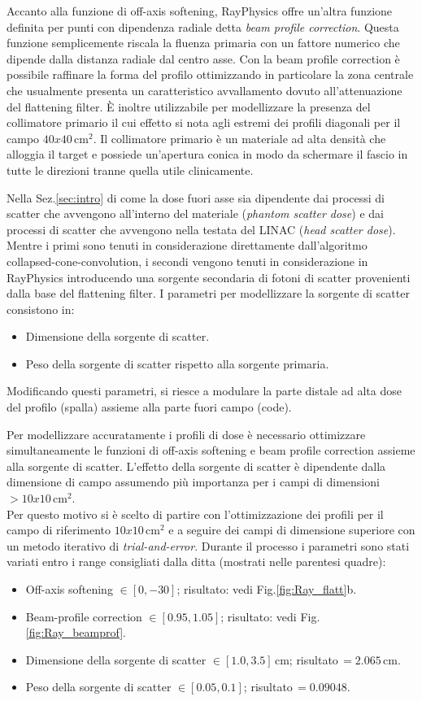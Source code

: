 Accanto alla funzione di off-axis softening, RayPhysics offre un'altra funzione definita per punti con dipendenza radiale detta \textit{beam profile correction}. Questa funzione semplicemente riscala la fluenza primaria con un fattore numerico che dipende dalla distanza radiale dal centro asse. Con la beam profile correction è possibile raffinare la forma del profilo ottimizzando in particolare la zona centrale che usualmente presenta un caratteristico avvallamento dovuto all'attenuazione del flattening filter. \`E inoltre utilizzabile per modellizzare la presenza del collimatore primario il cui effetto si nota agli estremi dei profili diagonali per il campo $40x40\,$cm$^2$. Il collimatore primario è un materiale ad alta densità che alloggia il target e possiede un'apertura conica in modo da schermare il fascio in tutte le direzioni tranne quella utile clinicamente.

Nella Sez.\ref{sec:intro} di come la dose fuori asse sia dipendente dai processi di scatter che avvengono all'interno del materiale (\textit{phantom scatter dose}) e dai processi di scatter che avvengono nella testata del LINAC (\textit{head scatter dose}). Mentre i primi sono tenuti in considerazione direttamente dall'algoritmo collapsed-cone-convolution, i secondi vengono tenuti in considerazione in RayPhysics introducendo una sorgente secondaria di fotoni di scatter provenienti dalla base del flattening filter. I parametri per modellizzare la sorgente di scatter consistono in:
\begin{itemize}
\item Dimensione della sorgente di scatter.
\item Peso della sorgente di scatter rispetto alla sorgente primaria.
\end{itemize}
Modificando questi parametri, si riesce a modulare la parte distale ad alta dose del profilo (spalla) assieme alla parte fuori campo (code).

Per modellizzare accuratamente i profili di dose è necessario ottimizzare simultaneamente le funzioni di off-axis softening e beam profile correction assieme alla sorgente di scatter. L'effetto della sorgente di scatter è dipendente dalla dimensione di campo assumendo più importanza per i campi di dimensioni $> 10x10\,$cm$^2$.\\
Per questo motivo si è scelto di partire con l'ottimizzazione dei profili per il campo di riferimento $10x10\,$cm$^2$ e a seguire dei campi di dimensione superiore con un metodo iterativo di \textit{trial-and-error}. Durante il processo i parametri sono stati variati entro i range consigliati dalla ditta (mostrati nelle parentesi quadre):
\begin{itemize}
\item Off-axis softening $\in[0,-30]$; risultato: vedi Fig.\ref{fig:Ray_flatt}b.
\item Beam-profile correction $\in[0.95,1.05]$; risultato: vedi Fig.\ref{fig:Ray_beamprof}.
\item Dimensione della sorgente di scatter $\in[1.0,3.5]\,$cm; risultato$\,=2.065\,$cm.
\item Peso della sorgente di scatter $\in[0.05,0.1]$; risultato$\,=0.09048$.
\end{itemize}

